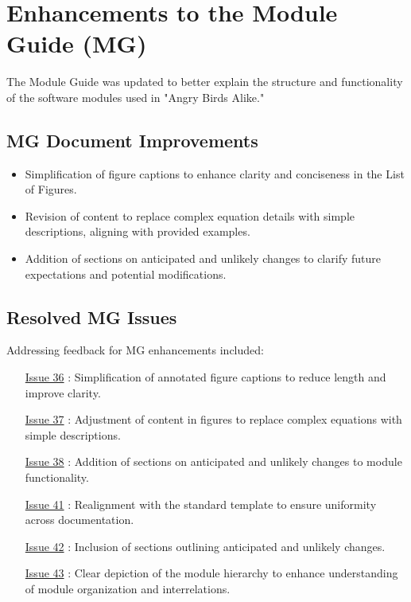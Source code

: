 \documentclass[12pt]{article}
\begin{document}
\section{Enhancements to the Module Guide (MG)}
The Module Guide was updated to better explain the structure and functionality of the software modules used in "Angry Birds Alike."

\subsection{MG Document Improvements}
\begin{itemize}
    \item Simplification of figure captions to enhance clarity and conciseness in the List of Figures.
    \item Revision of content to replace complex equation details with simple descriptions, aligning with provided examples.
    \item Addition of sections on anticipated and unlikely changes to clarify future expectations and potential modifications.
\end{itemize}

\subsection{Resolved MG Issues}
Addressing feedback for MG enhancements included:
\begin{itemize}
    \item [\href{https://github.com/XessX/Angry_Bird_Alike/issues/36}{Issue 36}]: Simplification of annotated figure captions to reduce length and improve clarity.
    \item [\href{https://github.com/XessX/Angry_Bird_Alike/issues/37}{Issue 37}]: Adjustment of content in figures to replace complex equations with simple descriptions.
    \item [\href{https://github.com/XessX/Angry_Bird_Alike/issues/38}{Issue 38}]: Addition of sections on anticipated and unlikely changes to module functionality.
    \item [\href{https://github.com/XessX/Angry_Bird_Alike/issues/41}{Issue 41}]: Realignment with the standard template to ensure uniformity across documentation.
    \item [\href{https://github.com/XessX/Angry_Bird_Alike/issues/42}{Issue 42}]: Inclusion of sections outlining anticipated and unlikely changes.
    \item [\href{https://github.com/XessX/Angry_Bird_Alike/issues/43}{Issue 43}]: Clear depiction of the module hierarchy to enhance understanding of module organization and interrelations.
\end{itemize}
\end{document}
